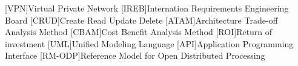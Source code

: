 [VPN]{Virtual Private Network}
[IREB]{Internation Requirements Engineering Board}
[CRUD]{Create Read Update Delete}
[ATAM]{Architecture Trade-off Analysis Method}
[CBAM]{Cost Benefit Analysis Method}
[ROI]{Return of investment}
[UML]{Unified Modeling Language}
[API]{Application Programming Interface}
[RM-ODP]{Reference Model for Open Distributed Processing}